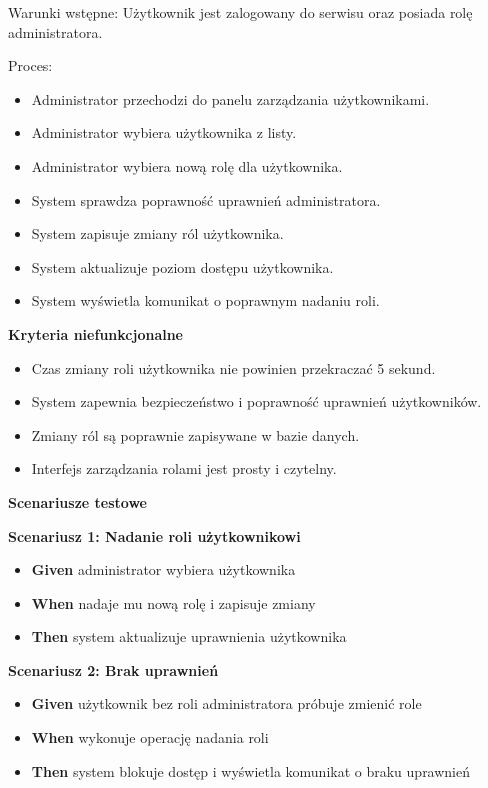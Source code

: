 \documentclass[a4paper,12pt]{article}
\begin{document}
\vspace{0,2cm}

\noindent Warunki wstępne: Użytkownik jest zalogowany do serwisu oraz posiada rolę administratora.

\vspace{0,2cm}

\noindent Proces:

\begin{itemize}
    \item Administrator przechodzi do panelu zarządzania użytkownikami.
    \item Administrator wybiera użytkownika z listy.
    \item Administrator wybiera nową rolę dla użytkownika.
    \item System sprawdza poprawność uprawnień administratora.
    \item System zapisuje zmiany ról użytkownika.
    \item System aktualizuje poziom dostępu użytkownika.
    \item System wyświetla komunikat o poprawnym nadaniu roli.
\end{itemize}

\noindent \textbf{Kryteria niefunkcjonalne}
\begin{itemize}
    \item Czas zmiany roli użytkownika nie powinien przekraczać 5 sekund.
    \item System zapewnia bezpieczeństwo i poprawność uprawnień użytkowników.
    \item Zmiany ról są poprawnie zapisywane w bazie danych.
    \item Interfejs zarządzania rolami jest prosty i czytelny.
\end{itemize}

\noindent \textbf{Scenariusze testowe}

\textbf{Scenariusz 1: Nadanie roli użytkownikowi}
\begin{itemize}
    \item \textbf{Given} administrator wybiera użytkownika
    \item \textbf{When} nadaje mu nową rolę i zapisuje zmiany
    \item \textbf{Then} system aktualizuje uprawnienia użytkownika
\end{itemize}

\textbf{Scenariusz 2: Brak uprawnień}
\begin{itemize}
    \item \textbf{Given} użytkownik bez roli administratora próbuje zmienić role
    \item \textbf{When} wykonuje operację nadania roli
    \item \textbf{Then} system blokuje dostęp i wyświetla komunikat o braku uprawnień
\end{itemize}
\end{document}

